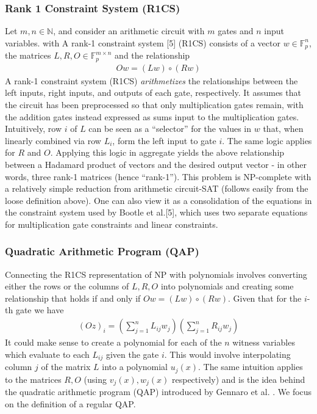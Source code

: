 \subsubsection{Rank 1 Constraint System (R1CS)}
Let $m, n \in \mathbb{N}$, and consider an arithmetic circuit with $m$ gates and $n$ input variables. with A rank-1 constraint system [5] (R1CS) consists of a vector $w \in \mathbb{F}_{p}^{n}$, the matrices $L, R, O \in \mathbb{F}_{p}^{m \times n}$ and the relationship
\begin{align}
Ow = (Lw) \circ (Rw)
\end{align}
A rank-1 constraint system (R1CS) \textit{arithmetizes} the relationships between the left inputs, right inputs, and outputs of each gate, respectively. It assumes that the circuit has been preprocessed so that only multiplication gates remain, with the addition gates instead expressed as sums input to the multiplication gates. Intuitively, row $i$ of $L$ can be seen as a ``selector'' for the values in $w$ that, when linearly combined via row $L_i$, form the left input to gate $i$. The same logic applies for $R$ and $O$. Applying this logic in aggregate yields the above relationship between a Hadamard product of vectors and the desired output vector - in other words, three rank-1 matrices (hence ``rank-1''). This problem is NP-complete with a relatively simple reduction from arithmetic circuit-SAT (follows easily from the loose definition above). One can also view it as a consolidation of the equations in the constraint system used by Bootle et al.[5], which uses two separate equations for multiplication gate constraints and linear constraints.

\subsubsection{Quadratic Arithmetic Program (QAP)}
Connecting the R1CS representation of NP with polynomials involves converting either the rows or the columns of $L, R, O$ into polynomials and creating some relationship that holds if and only if $Ow = (Lw) \circ (Rw)$. Given that for the $i$-th gate we have
\begin{align}
(Oz)_i = \left(\sum_{j=1}^n L_{ij}w_j\right)\left(\sum_{j=1}^n R_{ij}w_j\right)
\end{align}
It could make sense to create a polynomial for each of the $n$ witness variables which evaluate to each $L_{ij}$ given the gate $i$. This would involve interpolating column $j$ of the matrix $L$ into a polynomial $u_j(x)$. The same intuition applies to the matrices $R, O$ (using $v_j(x), w_j(x)$ respectively) and is the idea behind the quadratic arithmetic program (QAP) introduced by Gennaro et al. \cite{snarknopcp}. We focus on the definition of a regular QAP.

